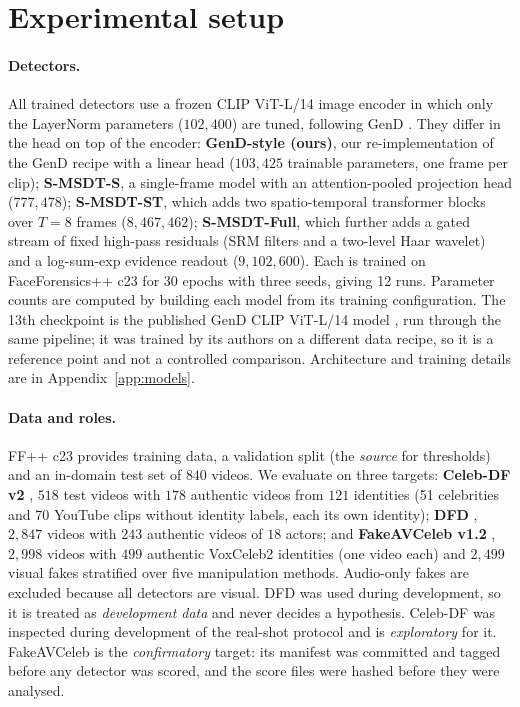 \section{Experimental setup}
\label{sec:setup}

\paragraph{Detectors.}
All trained detectors use a frozen CLIP ViT-L/14 image encoder \citep{radford2021learning,dosovitskiy2020image} in which only the LayerNorm parameters ($102{,}400$) are tuned, following GenD \citep{yermakov2026gend}. They differ in the head on top of the encoder:
\textbf{GenD-style (ours)}, our re-implementation of the GenD recipe with a linear head ($103{,}425$ trainable parameters, one frame per clip);
\textbf{S-MSDT-S}, a single-frame model with an attention-pooled projection head ($777{,}478$);
\textbf{S-MSDT-ST}, which adds two spatio-temporal transformer blocks over $T=8$ frames ($8{,}467{,}462$);
\textbf{S-MSDT-Full}, which further adds a gated stream of fixed high-pass residuals (SRM filters \citep{fridrich2012rich} and a two-level Haar wavelet) and a log-sum-exp evidence readout ($9{,}102{,}600$).
Each is trained on FaceForensics++ c23 \citep{rossler2019faceforensics} for 30 epochs with three seeds, giving 12 runs. Parameter counts are computed by building each model from its training configuration. The 13th checkpoint is the published GenD CLIP ViT-L/14 model \citep{yermakov2026gend}, run through the same pipeline; it was trained by its authors on a different data recipe, so it is a reference point and not a controlled comparison. Architecture and training details are in Appendix~\ref{app:models}.

\paragraph{Data and roles.}
FF++ c23 provides training data, a validation split (the \emph{source} for thresholds) and an in-domain test set of $840$ videos. We evaluate on three targets:
\textbf{Celeb-DF v2} \citep{li2020celeb}, $518$ test videos with $178$ authentic videos from $121$ identities (51 celebrities and 70 YouTube clips without identity labels, each its own identity);
\textbf{DFD} \citep{dufour2019deepfakedetection}, $2{,}847$ videos with $243$ authentic videos of $18$ actors; and
\textbf{FakeAVCeleb v1.2} \citep{khalid2021fakeavceleb}, $2{,}998$ videos with $499$ authentic VoxCeleb2 identities (one video each) and $2{,}499$ visual fakes stratified over five manipulation methods. Audio-only fakes are excluded because all detectors are visual.
DFD was used during development, so it is treated as \emph{development data} and never decides a hypothesis. Celeb-DF was inspected during development of the real-shot protocol and is \emph{exploratory} for it. FakeAVCeleb is the \emph{confirmatory} target: its manifest was committed and tagged before any detector was scored, and the score files were hashed before they were analysed.

